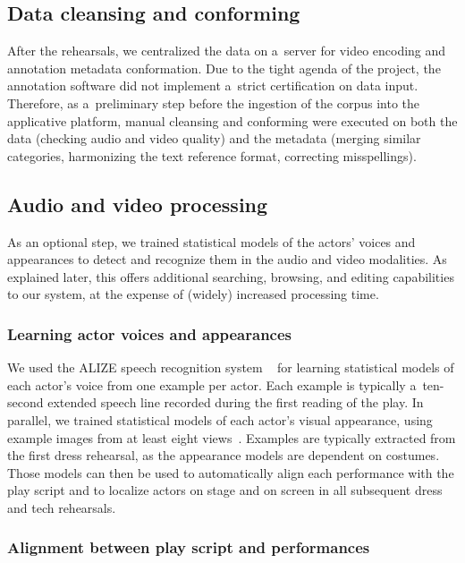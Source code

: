 \documentclass[conference]{IEEEtran}
\newcommand{\todo}[1]{\noindent\textcolor{red}{{\bf \{ToDo} #1{\bf \}}}}
\begin{document}
\subsection{Data cleansing and conforming}
After the rehearsals, we centralized the data on a~server for video encoding and annotation metadata conformation. Due to the tight agenda of the project, the annotation software did not implement a~strict certification on data input. Therefore, as a~preliminary step before the ingestion of the corpus into the applicative platform, manual cleansing and conforming were executed on both the data (checking audio and video quality) and the metadata (merging similar categories, harmonizing the text reference format, correcting misspellings).

\subsection{Audio and video processing}
As an optional step, we trained statistical models of the actors' voices and appearances to detect and recognize them in the audio and video modalities. As explained later, this offers additional searching, browsing, and editing capabilities to our system, at the expense of (widely) increased processing time.

\subsubsection{Learning actor voices and appearances}
We used the ALIZE speech recognition system ~\cite{Bonastre05} for learning statistical models of each actor's voice from one example per actor. Each example is typically a~ten-second extended speech line recorded during the first reading of the play. In parallel, we trained statistical models of each actor's visual appearance, using example images from at least eight views~\cite{Gandhi13}. Examples are typically extracted from the first dress rehearsal, as the appearance models are dependent on costumes.  Those models can then be used to automatically align each performance with the play script and to localize actors on stage and on screen in all subsequent dress and tech rehearsals. 

\subsubsection{Alignment between play script and performances}
\end{document}
